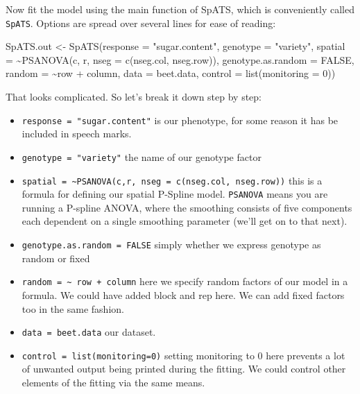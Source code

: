 \documentclass[
]{book}
\newenvironment{Shaded}{\begin{snugshade}}{\end{snugshade}}
\newcommand{\AttributeTok}[1]{\textcolor[rgb]{0.77,0.63,0.00}{#1}}
\newcommand{\ConstantTok}[1]{\textcolor[rgb]{0.00,0.00,0.00}{#1}}
\newcommand{\DecValTok}[1]{\textcolor[rgb]{0.00,0.00,0.81}{#1}}
\newcommand{\FunctionTok}[1]{\textcolor[rgb]{0.00,0.00,0.00}{#1}}
\newcommand{\NormalTok}[1]{#1}
\newcommand{\OtherTok}[1]{\textcolor[rgb]{0.56,0.35,0.01}{#1}}
\newcommand{\SpecialCharTok}[1]{\textcolor[rgb]{0.00,0.00,0.00}{#1}}
\newcommand{\StringTok}[1]{\textcolor[rgb]{0.31,0.60,0.02}{#1}}
\providecommand{\tightlist}{%
  \setlength{\itemsep}{0pt}\setlength{\parskip}{0pt}}
\begin{document}
Now fit the model using the main function of SpATS, which is conveniently called \texttt{SpATS}. Options are spread over several lines for ease of reading:

\begin{Shaded}
\begin{Highlighting}[]
\NormalTok{SpATS.out }\OtherTok{\textless{}{-}} \FunctionTok{SpATS}\NormalTok{(}\AttributeTok{response =} \StringTok{"sugar.content"}\NormalTok{, }\AttributeTok{genotype =} \StringTok{"variety"}\NormalTok{, }
    \AttributeTok{spatial =} \SpecialCharTok{\textasciitilde{}}\FunctionTok{PSANOVA}\NormalTok{(c, r, }\AttributeTok{nseg =} \FunctionTok{c}\NormalTok{(nseg.col, nseg.row)), }\AttributeTok{genotype.as.random =} \ConstantTok{FALSE}\NormalTok{, }
    \AttributeTok{random =} \SpecialCharTok{\textasciitilde{}}\NormalTok{row }\SpecialCharTok{+}\NormalTok{ column, }\AttributeTok{data =}\NormalTok{ beet.data, }\AttributeTok{control =} \FunctionTok{list}\NormalTok{(}\AttributeTok{monitoring =} \DecValTok{0}\NormalTok{))}
\end{Highlighting}
\end{Shaded}

That looks complicated. So let's break it down step by step:

\begin{itemize}
\tightlist
\item
  \texttt{response\ =\ "sugar.content"} is our phenotype, for some reason it has be included in speech marks.
\item
  \texttt{genotype\ =\ "variety"} the name of our genotype factor\\
\item
  \texttt{spatial\ =\ \textasciitilde{}PSANOVA(c,r,\ nseg\ =\ c(nseg.col,\ nseg.row))} this is a formula for defining our spatial P-Spline model. \texttt{PSANOVA} means you are running a P-spline ANOVA, where the smoothing consists of five components each dependent on a single smoothing parameter (we'll get on to that next).
\item
  \texttt{genotype.as.random\ =\ FALSE} simply whether we express genotype as random or fixed
\item
  \texttt{random\ =\ \textasciitilde{}\ row\ +\ column} here we specify random factors of our model in a formula. We could have added block and rep here. We can add fixed factors too in the same fashion.
\item
  \texttt{data\ =\ beet.data} our dataset.
\item
  \texttt{control\ =\ list(monitoring=0)} setting monitoring to 0 here prevents a lot of unwanted output being printed during the fitting. We could control other elements of the fitting via the same means.
\end{itemize}
\end{document}

